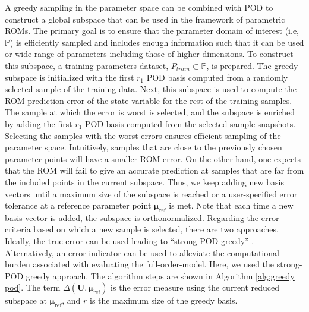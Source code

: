 \documentclass[]{interact}
\theoremstyle{plain}%
\theoremstyle{definition}
\theoremstyle{remark}
\begin{document}
A greedy sampling in the parameter space \cite{nguyen2009reduced} can be combined with POD to construct a global subspace that can be used in the framework of parametric ROMs.
The primary goal is to ensure that the parameter domain of interest (i.e, $\mathbb P$) is efficiently sampled and includes enough information such that it can be used or wide range of parameters including those of higher dimensions.
To construct this subspace, a training parameters dataset, $P_{train} \subset \mathbb P$, is prepared. 
The greedy subspace is initialized with the first $r_1$ POD basis computed from a randomly selected sample of the training data.
Next, this subspace is used to compute the ROM prediction error of the state variable for the rest of the training samples.
The sample at which the error is worst is selected, and the subspace is enriched by adding the first $r_1$ POD basis computed from the selected sample snapshots.
Selecting the samples with the worst errors ensures efficient sampling of the parameter space.
Intuitively, samples that are close to the previously chosen parameter points will have a smaller ROM error.
On the other hand, one expects that the ROM will fail to give an accurate prediction at samples that are far from the included points in the current subspace.
Thus, we keep adding new basis vectors until a maximum size of the subspace is reached or a user-specified error tolerance at a reference parameter point $\boldsymbol{\mu}_{\text{ref}}$ is met.
Note that each time a new basis vector is added, the subspace is orthonormalized.
Regarding the error criteria based on which a new sample is selected, there are two approaches. 
Ideally, the true error can be used leading to ``strong POD-greedy'' \cite{benner2017model}.
Alternatively, an error indicator can be used to alleviate the computational burden associated with evaluating the full-order-model. 
Here, we used the strong-POD greedy approach. 
The algorithm steps are shown in Algorithm \ref{alg:greedy pod}. 
The term $\Delta(\textbf{U},\boldsymbol{\mu}_\text{ref})$  is the error measure using the current reduced subspace at $\boldsymbol{\mu}_\text{ref}$, and $r$ is the maximum size of the greedy basis.
\end{document}
